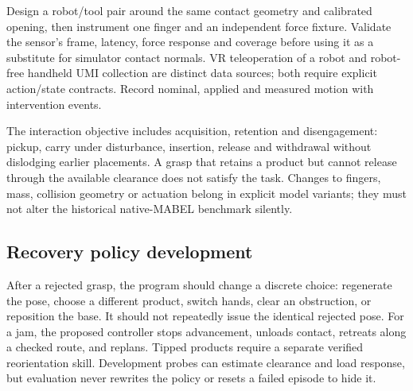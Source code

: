 Design a robot/tool pair around the same contact geometry and calibrated opening,
then instrument one finger and an independent force fixture. Validate the sensor's
frame, latency, force response and coverage before using it as a substitute for
simulator contact normals. VR teleoperation of a robot and robot-free handheld
UMI collection are distinct data sources; both require explicit action/state
contracts. Record nominal, applied and measured motion with intervention events.

The interaction objective includes acquisition, retention and disengagement:
pickup, carry under disturbance, insertion, release and withdrawal without
dislodging earlier placements. A grasp that retains a product but cannot release
through the available clearance does not satisfy the task. Changes to fingers,
mass, collision geometry or actuation belong in explicit model variants; they
must not alter the historical native-MABEL benchmark silently.

\subsection{Recovery policy development}
After a rejected grasp, the program should change a discrete choice: regenerate
the pose, choose a different product, switch hands, clear an obstruction, or
reposition the base. It should not repeatedly issue the identical rejected pose.
For a jam, the proposed controller stops advancement, unloads contact, retreats
along a checked route, and replans. Tipped products require a separate verified
reorientation skill. Development probes can estimate clearance and load response,
but evaluation never rewrites the policy or resets a failed episode to hide it.
